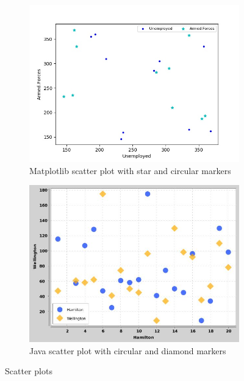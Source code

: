 \documentclass[12pt, a4paper,oneside]{report}
\begin{document}
\begin{figure}[!htb]
	\begin{subfigure}{.6\textwidth}
		\centering
		\includegraphics[width=.9\linewidth]{scatter1}
		\caption{Matplotlib scatter plot with star and circular markers }
		\label{fig:scatter1}
	\end{subfigure}%
	\begin{subfigure}{.5\textwidth}
		\centering
		\includegraphics[width=.9\linewidth]{scatter2}
		\caption{Java scatter plot with circular and diamond markers}
		\label{fig:scatter2}
	\end{subfigure}
	\caption{Scatter plots}
	\label{fig:scatters}
\end{figure}
\end{document}
